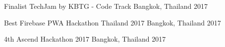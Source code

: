 


\begin{cvhonors}

  \cvhonor
    {Finalist} %
    {TechJam by KBTG - Code Track} %
    {Bangkok, Thailand} %
    {2017} %

  \cvhonor
    {Best Firebase} %
    {PWA Hackathon Thailand 2017} %
    {Bangkok, Thailand} %
    {2017} %

  \cvhonor
    {4th} %
    {Ascend Hackathon 2017} %
    {Bangkok, Thailand} %
    {2017} %


\end{cvhonors}

